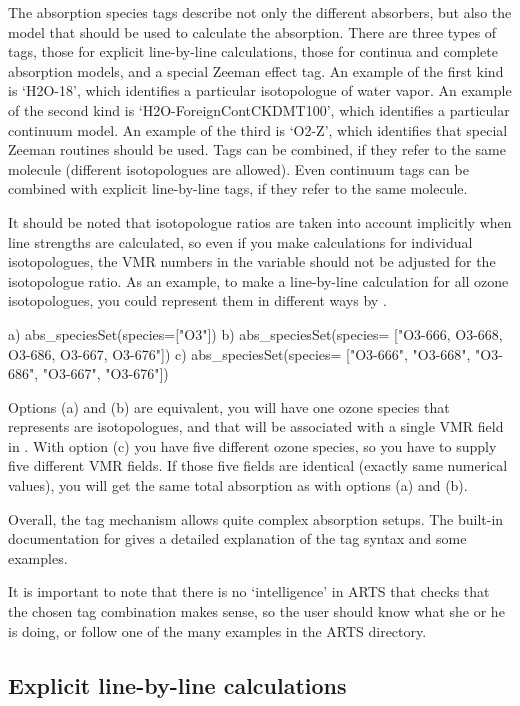The absorption species tags describe not only the different absorbers,
but also the model that should be used to calculate the absorption.
There are three types of tags, those for explicit line-by-line
calculations, those for continua and complete absorption models, and a special Zeeman effect tag.
An example of the first kind is `H2O-18', which identifies a
particular isotopologue of water vapor.  An example of the second kind is
`H2O-ForeignContCKDMT100', which identifies a particular continuum
model.  An example of the third is `O2-Z', which identifies that special Zeeman routines should be used.
Tags can be combined, if they refer to the same molecule
(different isotopologues are allowed). Even continuum tags can be combined
with explicit line-by-line tags, if they refer to the same molecule.

It should be noted that isotopologue ratios are taken into account
implicitly when line strengths are calculated, so even if you make
calculations for individual isotopologues, the VMR numbers in the
variable  should not be adjusted for the isotopologue
ratio. As an example, to make a line-by-line calculation for all ozone
isotopologues, you could represent them in different ways by
.
\begin{code}
a) abs_speciesSet(species=["O3"])
b) abs_speciesSet(species=
                  ["O3-666, O3-668, O3-686, O3-667, O3-676"])
c) abs_speciesSet(species= 
                  ["O3-666", "O3-668", "O3-686", "O3-667", "O3-676"])
\end{code}
Options (a) and (b) are equivalent, you will have one ozone species
that represents are isotopologues, and that will be associated with a
single VMR field in .  With option (c) you have
five different ozone species, so you have to supply five different VMR
fields. If those five fields are identical (exactly same numerical
values), you will get the same total absorption as with options (a)
and (b).

Overall, the tag mechanism allows quite complex
absorption setups. The built-in documentation for
 gives a detailed explanation of the tag syntax
and some examples.  

It is important to note that there is no `intelligence' in ARTS that
checks that the chosen tag combination makes sense, so the user should
know what she or he is doing, or follow one of the many examples in
the ARTS  directory.

\subsection{Explicit line-by-line calculations}

